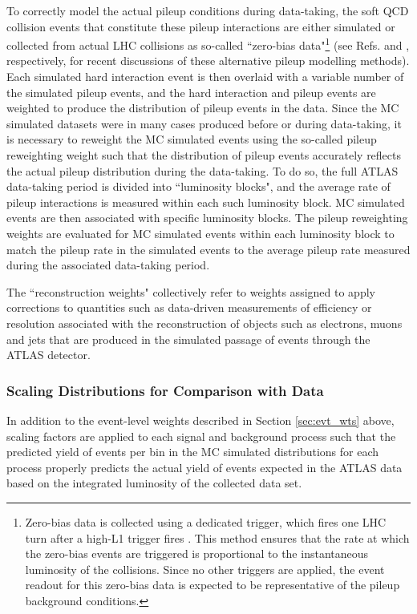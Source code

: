 To correctly model the actual pileup conditions during data-taking, the soft QCD collision events that constitute these pileup interactions are either simulated or collected from actual LHC collisions as so-called ``zero-bias data"\footnote{Zero-bias data is collected using a dedicated trigger, which fires one LHC turn after a high-\pt L1 trigger fires \cite{data_overlay_pileup}. This method ensures that the rate at which the zero-bias events are triggered is proportional to the instantaneous luminosity of the collisions. Since no other triggers are applied, the event readout for this zero-bias data is expected to be representative of the pileup background conditions.} (see Refs. \cite{MC_overlay_pileup} and \cite{data_overlay_pileup}, respectively, for recent discussions of these alternative pileup modelling methods). Each simulated hard interaction event is then overlaid with a variable number of the simulated pileup events, and the hard interaction and pileup events are weighted to produce the distribution of pileup events in the data. Since the MC simulated datasets were in many cases produced before or during data-taking, it is necessary to reweight the MC simulated events using the so-called pileup reweighting weight such that the distribution of pileup events accurately reflects the actual pileup distribution during the data-taking. To do so, the full ATLAS data-taking period is divided into ``luminosity blocks", and the average rate of pileup interactions is measured within each such luminosity block. MC simulated events are then associated with specific luminosity blocks. The pileup reweighting weights are evaluated for MC simulated events within each luminosity block to match the pileup rate in the simulated events to the average pileup rate measured during the associated data-taking period.

The ``reconstruction weights" collectively refer to weights assigned to apply corrections to quantities such as data-driven measurements of efficiency or resolution associated with the reconstruction of objects such as electrons, muons and jets that are produced in the simulated passage of events through the ATLAS detector.

\subsubsection{Scaling Distributions for Comparison with Data}

In addition to the event-level weights described in Section \ref{sec:evt_wts} above, scaling factors are applied to each signal and background process such that the predicted yield of events per bin in the MC simulated distributions for each process properly predicts the actual yield of events expected in the ATLAS data based on the integrated luminosity of the collected data set.

